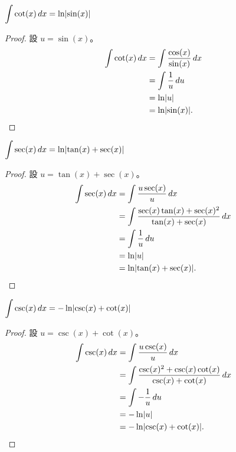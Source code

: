 \documentclass{beamer}
\newcommand{\Left} {\mathopen{}\mathclose\bgroup\left}
\newcommand{\Right}{\aftergroup\egroup\right}
\theoremstyle{remark}
\begin{document}
\begin{CJK}{UTF8}{bsmi}
\begin{frame}{$\displaystyle \int \cot(x)\,dx = \ln \Left| \sin(x) \Right|$}
  \begin{proof}
    設 $u = \sin(x)$。
    \begin{align*}
      \int \cot(x)\,dx &= \int \frac{\cos(x)}{\sin(x)}\,dx\\
        &= \int \frac{1}{u}\,du\\
	&= \ln \Left| u \Right|\\
	&= \ln \Left| \sin(x) \Right|. \qedhere
    \end{align*}
  \end{proof}
\end{frame}

\begin{frame}{$\displaystyle \int \sec(x)\,dx = \ln \Left| \tan(x) + \sec(x) \Right|$}
  \begin{proof}
    設 $u = \tan(x) + \sec(x)$。
    \begin{align*}
      \int \sec(x)\,dx &= \int \frac{u \sec(x)}{u}\,dx\\
	&= \int \frac{\sec(x) \tan(x) + \sec(x)^2}{\tan(x) + \sec(x)}\,dx\\
        &= \int \frac{1}{u}\,du\\
	&= \ln \Left| u \Right|\\
	&= \ln \Left| \tan(x) + \sec(x) \Right|. \qedhere
    \end{align*}
  \end{proof}
\end{frame}

\begin{frame}{$\displaystyle \int \csc(x)\,dx = -\ln \Left| \csc(x) + \cot(x) \Right|$}
  \begin{proof}
    設 $u = \csc(x) + \cot(x)$。
    \begin{align*}
      \int \csc(x)\,dx &= \int \frac{u \csc(x)}{u}\,dx\\
	&= \int \frac{\csc(x)^2 + \csc(x) \cot(x)}{\csc(x) + \cot(x)}\,dx\\
        &= \int -\frac{1}{u}\,du\\
	&= -\ln \Left| u \Right|\\
	&= -\ln \Left| \csc(x) + \cot(x) \Right|. \qedhere
    \end{align*}
  \end{proof}
\end{frame}


\end{CJK}
\end{document}
